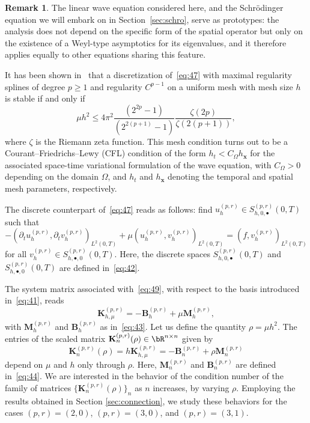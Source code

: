\documentclass[addpoints,12pt,letter]{article}
\newcommand{\bx}{\boldsymbol{x}}
\newcommand{\Om}{\Omega}
\newcommand{\ze}{\zeta}
\newcommand{\TF}{T}
\renewcommand{\ge}{\geqslant}
\renewcommand{\le}{\leqslant}
\numberwithin{equation}{section}
\theoremstyle{definition}
\newtheorem{remark}[lemma]{Remark}
\begin{document}
\begin{remark}
The linear wave equation considered here, and the Schr\"odinger equation we will embark on in Section~\ref{sec:schro}, serve as prototypes: the analysis does not depend on the specific form of the spatial operator but only on the existence of a Weyl-type asymptotics for its eigenvalues, and it therefore applies equally to other equations sharing this feature.
\end{remark}

It has been shown in~\cite{FeFr26} that a discretization of~\eqref{eq:47} with maximal regularity splines of degree $p\ge 1$ and regularity $C^{p-1}$ on a uniform mesh with mesh size $h$ is stable if and only if
\begin{equation} \label{rho}
\mu h^{2}\le 4\pi^{2}\frac{(2^{2p}-1)}{(2^{2(p+1)}-1)}\frac{\ze(2p)}{\ze(2(p+1))},
\end{equation}
where $\ze$ is the Riemann zeta function.
This mesh condition turns out to be a Courant--Friedrichs--Lewy (CFL) condition of the form $h_{t}<C_{\Om} h_{\bx}$ for the associated space-time variational formulation of the wave equation, with $C_{\Om}>0$ depending on the domain $\Om$, and $h_{t}$ and $h_{\bx}$ denoting the temporal and spatial mesh parameters, respectively.

The discrete counterpart of~\eqref{eq:47} reads as follows: find $u_{h}^{(p,r)}\in S_{h,0,\bullet}^{(p,r)}(0,\TF)$ such that
\begin{equation}\label{eq:49}
-(\partial_{t} u_{h}^{(p,r)},\partial_{t} v_{h}^{(p,r)})_{L^{2}(0,\TF)}+\mu (u_{h}^{(p,r)},v_{h}^{(p,r)})_{L^{2}(0,\TF)}=(f,v_{h}^{(p,r)})_{L^{2}(0,\TF)}
\end{equation}
for all $v_{h}^{(p,r)}\in S_{h,\bullet,0}^{(p,r)}(0,\TF )$.
Here, the discrete spaces $S_{h,0,\bullet}^{(p,r)}(0,\TF)$ and $S_{h,\bullet,0}^{(p,r)}(0,\TF)$ are defined in~\eqref{eq:42}.

The system matrix associated with~\eqref{eq:49}, with respect to the basis introduced in~\eqref{eq:41}, reads
\[
\mathbf{K}_{h,\mu}^{(p,r)}=-\mathbf{B}_{h}^{(p,r)}+\mu\mathbf{M}_{h}^{(p,r)},
\]
with $\mathbf{M}_{h}^{(p,r)}$ and $\mathbf{B}_{h}^{(p,r)}$ as in~\eqref{eq:43}.
Let us define the quantity $\rho=\mu h^{2}$.
The entries of the scaled matrix $\mathbf{K}_{n}^{(p,r)}(\rho)\in\bR^{n\times n}$ given by
\begin{equation} \label{eq:knp}
\mathbf{K}_{n}^{(p,r)}(\rho)=h\mathbf{K}_{h,\mu}^{(p,r)}=-\mathbf{B}_{n}^{(p,r)}+\rho\mathbf{M}_{n}^{(p,r)}
\end{equation}
depend on $\mu$ and $h$ only through $\rho$.
Here, $\mathbf{M}_{n}^{(p,r)}$ and $\mathbf{B}_{n}^{(p,r)}$ are defined in~\eqref{eq:44}.
We are interested in the behavior of the condition number of the family of matrices $\{\mathbf{K}_{n}^{(p,r)}(\rho)\}_{n}$ as $n$ increases, by varying $\rho$.
Employing the results obtained in Section \ref{sec:connection}, we study these behaviors for the cases $(p,r)=(2,0)$, $(p,r)=(3,0)$, and $(p,r)=(3,1)$.
\medskip
\end{document}
